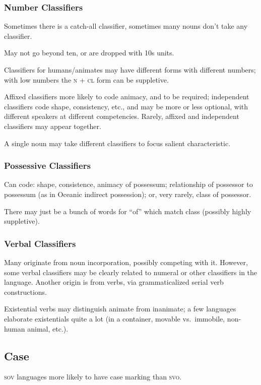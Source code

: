 \documentclass[11pt]{article}
\newcommand{\I}[1]{\textsc{#1}}   %
\begin{document}
\subsubsection{Number Classifiers}
Sometimes there is a catch-all classifier, sometimes many nouns don't
take any classifier.

May not go beyond ten, or are dropped with 10s units.

Classifiers for humans/animates may have different forms with
different numbers; with low numbers the \I{n + cl} form can be
suppletive.

Affixed classifiers more likely to code animacy, and to be required;
independent classifiers code shape, consistency, etc., and may be more
or less optional, with different speakers at different competencies.
Rarely, affixed and independent classifiers may appear together.

A single noun may take different classifiers to focus salient
characteristic.

\subsubsection{Possessive Classifiers}
Can code: shape, consistence, animacy of possessum; relationship of
possessor to possessum (as in Oceanic indirect possession); or, very
rarely, class of possessor.

There may just be a bunch of words for ``of'' which match class
(possibly highly suppletive).

\subsubsection{Verbal Classifiers} 
Many originate from noun incorporation, possibly competing with it.
However, some verbal classifiers may be clearly related to numeral or
other classifiers in the language.  Another origin is from verbs, via
grammaticalized serial verb constructions.

Existential verbs may distinguish animate from inanimate; a few
languages elaborate existentials quite a lot (in a container, movable
vs.\ immobile, non-human animal, etc.).

\subsection{Case}
\I{sov} languages more likely to have case marking than \I{svo}.
\end{document}
